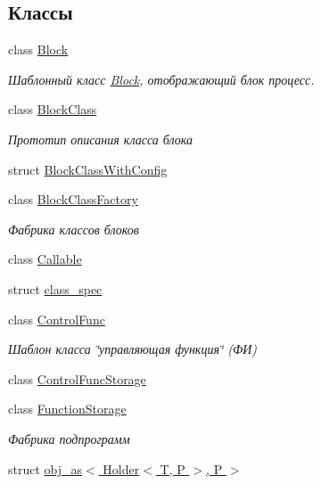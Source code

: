\subsection*{Классы}
\begin{DoxyCompactItemize}
\item 
class \hyperlink{classLIBKMS__namespace_1_1Block}{Block}
\begin{DoxyCompactList}\small\item\em Шаблонный класс \hyperlink{classLIBKMS__namespace_1_1Block}{Block}, отображающий блок процесс. \end{DoxyCompactList}\item 
class \hyperlink{classLIBKMS__namespace_1_1BlockClass}{Block\-Class}
\begin{DoxyCompactList}\small\item\em Прототип описания класса блока \end{DoxyCompactList}\item 
struct \hyperlink{structLIBKMS__namespace_1_1BlockClassWithConfig}{Block\-Class\-With\-Config}
\item 
class \hyperlink{classLIBKMS__namespace_1_1BlockClassFactory}{Block\-Class\-Factory}
\begin{DoxyCompactList}\small\item\em Фабрика классов блоков \end{DoxyCompactList}\item 
class \hyperlink{classLIBKMS__namespace_1_1Callable}{Callable}
\item 
struct \hyperlink{structLIBKMS__namespace_1_1class__spec}{class\-\_\-spec}
\item 
class \hyperlink{classLIBKMS__namespace_1_1ControlFunc}{Control\-Func}
\begin{DoxyCompactList}\small\item\em Шаблон класса \char`\"{}управляющая функция\char`\"{} (ФИ) \end{DoxyCompactList}\item 
class \hyperlink{classLIBKMS__namespace_1_1ControlFuncStorage}{Control\-Func\-Storage}
\item 
class \hyperlink{classLIBKMS__namespace_1_1FunctionStorage}{Function\-Storage}
\begin{DoxyCompactList}\small\item\em Фабрика подпрограмм \end{DoxyCompactList}\item 
struct \hyperlink{structLIBKMS__namespace_1_1obj__as_3_01Holder_3_01T_00_01P_01_4_00_01P_01_4}{obj\-\_\-as$<$ Holder$<$ T, P $>$, P $>$}

\end{DoxyCompactItemize}
